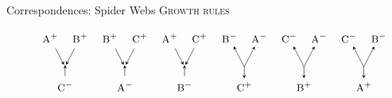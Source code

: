 \documentclass{beamer}
\newcommand\tsc[1]{\alert{\textsc{#1}}}
\begin{document}
	\begin{frame}{Correspondences: Spider Webs}
		\center \tsc{Growth rules}
		\vspace{-.6cm}
		\begin{figure}[h!]
			\[
			\begin{tikzpicture}[
			scale=.7,
			every node/.style={anchor=base},xscale=1.35,yscale=1.1,
			-->/.style={->,shorten >=2pt,shorten <=2pt,>=stealth},
			<--/.style={<-,shorten >=2pt,shorten <=2pt,>=stealth},
			--->/.style={->,shorten >=1pt,shorten <=1pt,>=stealth},
			<---/.style={<-,>=stealth},
			]
			\node (i1) at (0,0) {$\textsc{\small A}^+$};
			\node (ii1) at (1,0) {$\textsc{\small B}^+$};
			\node (d1) at (.5,-1) {};
			\node (o1) at (.5,-2) {$\textsc{\small C}^-$};
			\draw[-->] (i1) -- (d1.center);
			\draw[-->] (ii1) -- (d1.center);
			\draw[<--] (d1.north) -- (o1);
			
			\node (i2) at (2,0) {$\textsc{\small B}^+$};
			\node (ii2) at (3,0) {$\textsc{\small C}^+$};
			\node (d2) at (2.5,-1) {};
			\node (o2) at (2.5,-2) {$\textsc{\small A}^-$};
			\draw[-->] (i2) -- (d2.center);
			\draw[-->] (ii2) -- (d2.center);
			\draw[<--] (d2.north) -- (o2);
			
			\node (i3) at (4,0) {$\textsc{\small A}^+$};
			\node (ii3) at (5,0) {$\textsc{\small C}^+$};
			\node (d3) at (4.5,-1) {};
			\node (o3) at (4.5,-2) {$\textsc{\small B}^-$};
			\draw[-->] (i3) -- (d3.center);
			\draw[-->] (ii3) -- (d3.center);
			\draw[<--] (d3.north) -- (o3);
			
			\node (i4) at (6,0) {$\textsc{\small B}^-$};
			\node (ii4) at (7,0) {$\textsc{\small A}^-$};
			\node (d4) at (6.5,-1) {};
			\node (o4) at (6.5,-2) {$\textsc{\small C}^+$};
			\draw[<-,>=stealth] (i4) -- (d4.center);
			\draw[<-,>=stealth] (ii4) -- (d4.center);
			\draw[->,>=stealth] (d4.center) -- (o4);
			
			\node (i5) at (8,0) {$\textsc{\small C}^-$};
			\node (ii5) at (9,0) {$\textsc{\small A}^-$};
			\node (d5) at (8.5,-1) {};
			\node (o5) at (8.5,-2) {$\textsc{\small B}^+$};
			\draw[<-,>=stealth] (i5) -- (d5.center);
			\draw[<-,>=stealth] (ii5) -- (d5.center);
			\draw[->,>=stealth] (d5.center) -- (o5);
			
			\node (i6) at (10,0) {$\textsc{\small C}^-$};
			\node (ii6) at (11,0) {$\textsc{\small B}^-$};
			\node (d6) at (10.5,-1) {};
			\node (o6) at (10.5,-2) {$\textsc{\small A}^+$};
			\draw[<-,>=stealth] (i6) -- (d6.center);
			\draw[<-,>=stealth] (ii6) -- (d6.center);
			\draw[->,>=stealth] (d6.center) -- (o6);
			

\end{tikzpicture}\]
\end{figure}
\end{frame}
\end{document}
